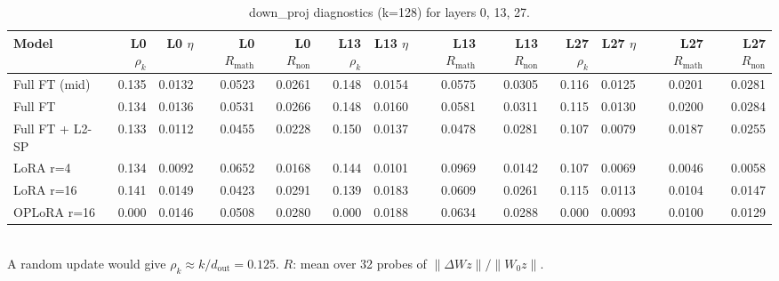 \begin{table}[t]
\centering
\scriptsize
\begin{tabular}{lrrrrrrrrrrrr}
\toprule
Model & L0 $\rho_k$ & L0 $\eta$ & L0 $R_\text{math}$ & L0 $R_\text{non}$ & L13 $\rho_k$ & L13 $\eta$ & L13 $R_\text{math}$ & L13 $R_\text{non}$ & L27 $\rho_k$ & L27 $\eta$ & L27 $R_\text{math}$ & L27 $R_\text{non}$ \\
\midrule
Full FT (mid) & 0.135 & 0.0132 & 0.0523 & 0.0261 & 0.148 & 0.0154 & 0.0575 & 0.0305 & 0.116 & 0.0125 & 0.0201 & 0.0281 \\
Full FT & 0.134 & 0.0136 & 0.0531 & 0.0266 & 0.148 & 0.0160 & 0.0581 & 0.0311 & 0.115 & 0.0130 & 0.0200 & 0.0284 \\
Full FT + L2-SP & 0.133 & 0.0112 & 0.0455 & 0.0228 & 0.150 & 0.0137 & 0.0478 & 0.0281 & 0.107 & 0.0079 & 0.0187 & 0.0255 \\
LoRA r=4 & 0.134 & 0.0092 & 0.0652 & 0.0168 & 0.144 & 0.0101 & 0.0969 & 0.0142 & 0.107 & 0.0069 & 0.0046 & 0.0058 \\
LoRA r=16 & 0.141 & 0.0149 & 0.0423 & 0.0291 & 0.139 & 0.0183 & 0.0609 & 0.0261 & 0.115 & 0.0113 & 0.0104 & 0.0147 \\
OPLoRA r=16 & 0.000 & 0.0146 & 0.0508 & 0.0280 & 0.000 & 0.0188 & 0.0634 & 0.0288 & 0.000 & 0.0093 & 0.0100 & 0.0129 \\
\bottomrule
\end{tabular}
\\[2pt]{\footnotesize A random update would give $\rho_k \approx k/d_\text{out} = 0.125$. $R$: mean over 32 probes of $\|\Delta W z\|/\|W_0 z\|$.}
\caption{down\_proj diagnostics (k=128) for layers 0, 13, 27.}
\label{tab:t1-diag}
\end{table}
